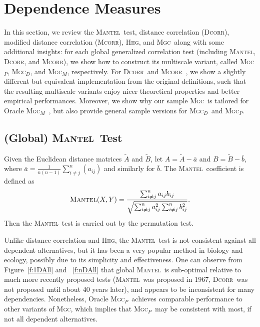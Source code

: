 \documentclass[11pt]{article}
\providecommand{\sct}[1]{{\normalfont\textsc{#1}}}
\newcommand{\Mgc}{\sct{Mgc}}
\newcommand{\Mgcp}{\sct{Mgc$_P$}}
\newcommand{\Mgcd}{\sct{Mgc$_D$}}
\newcommand{\Mgcm}{\sct{Mgc$_M$}}
\newcommand{\Hhg}{\sct{Hhg}}
\newcommand{\Dcorr}{\sct{Dcorr}}
\newcommand{\Mcorr}{\sct{Mcorr}}
\newcommand{\Mantel}{\sct{Mantel}}
\begin{document}
\clearpage
\section{Dependence Measures}
\label{appen:methods}

In this section, we review the \Mantel~test, distance correlation (\Dcorr), modified distance correlation (\Mcorr),  \Hhg, and \Mgc~along with some additional insights: for each global generalized correlation test (including \Mantel, \Dcorr, and \Mcorr), we show how to construct its multiscale variant, called \Mgcp, \Mgcd, and \Mgcm, respectively. For \Dcorr~and \Mcorr~, we show a slightly different but equivalent implementation from the original definitions, such that the resulting multiscale variants enjoy nicer theoretical properties and better empirical performances. Moreover, we show why our sample \Mgc~is tailored for Oracle \Mgcm~, but also provide general sample versions for \Mgcd~and \Mgcp.

\subsection{(Global) \Mantel~Test}
\label{appen:mantel}
Given the Euclidean distance matrices $\tilde{A}$ and $\tilde{B}$, let $A=\tilde{A}-\bar{a}$ and $B=\tilde{B}-\bar{b}$, where $\bar{a}=\frac{1}{n(n-1)}\sum_{i \neq j}^{n}(a_{ij})$ and similarly for $\bar{b}$.
The \Mantel~coefficient \cite{Mantel1967} is defined as
\begin{equation*}
\Mantel(X,Y)=\frac{\sum_{i \neq j}^{n}a_{ij}b_{ij}}{\sqrt{\sum_{i \neq j}^{n}a_{ij}^2 \sum_{i \neq j}^{n}b_{ij}^2}}.
\end{equation*}
Then the \Mantel~test is carried out by the permutation test.

Unlike distance correlation and \Hhg, the \Mantel~test is not consistent against all dependent alternatives, but it has been a very popular method in biology and ecology, possibly due to its simplicity and effectiveness. One can observe from Figure~\ref{f:1DAll} and ~\ref{f:nDAll} that global \Mantel~is sub-optimal relative to much more recently proposed tests (\Mantel~was proposed in 1967, \Dcorr~was not proposed until about 40 years later), and appears to be inconsistent for many dependencies. Nonetheless, Oracle \Mgcp~achieves comparable performance to other variants of \Mgc, which implies that \Mgcp~may be consistent with most, if not all dependent alternatives.
%
%
%
\end{document}
